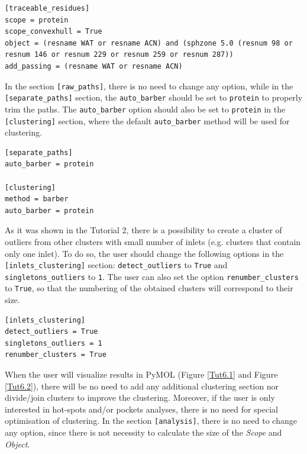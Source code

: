 \documentclass[9pt,tutorial]{livecoms}
\begin{document}
\begin{lstlisting}
[traceable_residues]
scope = protein
scope_convexhull = True
object = (resname WAT or resname ACN) and (sphzone 5.0 (resnum 98 or resnum 146 or resnum 229 or resnum 259 or resnum 287))
add_passing = (resname WAT or resname ACN)
\end{lstlisting}
In the section \texttt{[raw\_paths]}, there is no need to change any option, while in the \texttt{[separate\_paths]} section, the \texttt{auto\_barber} should be set to \texttt{protein} to properly trim the paths. The \texttt{auto\_barber} option should also be set to \texttt{protein} in the \texttt{[clustering]} section, where the default \texttt{auto\_barber} method will be used for clustering. 
\begin{lstlisting}
[separate_paths]
auto_barber = protein

[clustering]
method = barber
auto_barber = protein
\end{lstlisting}
As it was shown in the Tutorial 2, there is a possibility to create a cluster of outliers from other clusters with small number of inlets (e.g. clusters that contain only one inlet). To do so, the user should change the following options in the \texttt{[inlets\_clustering]} section: \texttt{detect\_outliers} to \texttt{True} and \texttt{singletons\_outliers} to \texttt{1}.  The user can also set the option \texttt{renumber\_clusters} to \texttt{True}, so that the numbering of the obtained clusters will correspond to their size.
\begin{lstlisting}
[inlets_clustering]
detect_outliers = True
singletons_outliers = 1
renumber_clusters = True
\end{lstlisting}
When the user will visualize results in PyMOL (Figure \ref{Tut6.1} and Figure \ref{Tut6.2}), there will be no need to add any additional clustering section nor divide/join clusters to improve the clustering. Moreover, if the user is only interested in hot-spots and/or pockets analyses, there is no need for special optimisation of clustering. 
In the section \texttt{[analysis]}, there is no need to change any option, since there is not necessity to calculate the size of the \emph{Scope} and \emph{Object}.
\end{document}
